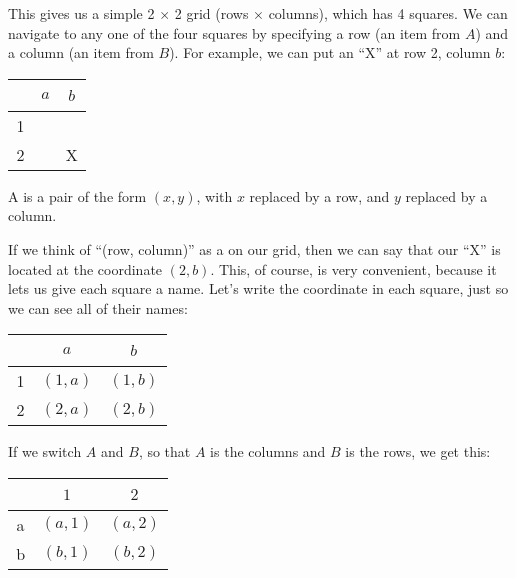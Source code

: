 \documentclass[../../../main.tex]{subfiles}
\begin{document}
\noindent
This gives us a simple 2 $\times$ 2 grid (rows $\times$ columns), which has 4 squares. We can navigate to any one of the four squares by specifying a row (an item from $A$) and a column (an item from $B$). For example, we can put an ``X'' at row 2, column $b$:

\begin{center}
  \begin{tabular}{| c | c | c |}
    \hline
    ~ & $a$ & $b$ \\
    \hline
    1 & ~ & ~ \\
    \hline
    2 & ~ & X \\
    \hline
  \end{tabular}
\end{center}

\begin{terminology}
  A  is a pair of the form $(x, y)$, with $x$ replaced by a row, and $y$ replaced by a column. 
\end{terminology}

If we think of ``(row, column)'' as a  on our grid, then we can say that our ``X'' is located at the coordinate $(2, b)$. This, of course, is very convenient, because it lets us give each square a name. Let's write the coordinate in each square, just so we can see all of their names:

\begin{center}
  \begin{tabular}{| c | c | c |}
    \hline
    ~ & $a$ & $b$ \\
    \hline
    1 & $(1, a)$ & $(1, b)$ \\
    \hline
    2 & $(2, a)$ & $(2, b)$ \\
    \hline
  \end{tabular}
\end{center}

If we switch $A$ and $B$, so that $A$ is the columns and $B$ is the rows, we get this: 

\begin{center}
  \begin{tabular}{| c | c | c |}
    \hline
    ~ & $1$ & $2$ \\
    \hline
    a & $(a, 1)$ & $(a, 2)$ \\
    \hline
    b & $(b, 1)$ & $(b, 2)$ \\
    \hline
  \end{tabular}
\end{center}
\end{document}

